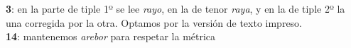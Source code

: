 
\noindent\textbf{3}: en la parte de tiple 1º se lee \textit{rayo}, en la de tenor \textit{raya}, y en la de tiple 2º la una corregida por la otra. Optamos por la versión de texto impreso.\\
\noindent\textbf{14}: mantenemos \textit{arebor} para respetar la métrica
